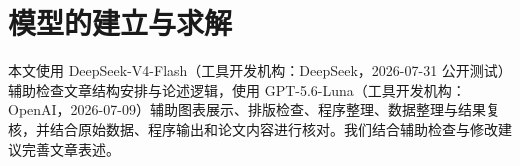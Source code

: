 \section{模型的建立与求解}

本文使用 DeepSeek-V4-Flash（工具开发机构：DeepSeek，2026-07-31 公开测试）辅助检查文章结构安排与论述逻辑，使用 GPT-5.6-Luna（工具开发机构：OpenAI，2026-07-09）辅助图表展示、排版检查、程序整理、数据整理与结果复核，并结合原始数据、程序输出和论文内容进行核对。我们结合辅助检查与修改建议完善文章表述。





